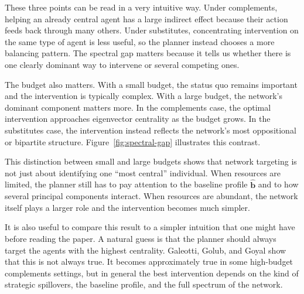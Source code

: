 \documentclass[11pt,letterpaper]{article}
\begin{document}
These three points can be read in a very intuitive way. Under complements, helping an already central agent has a large indirect effect because their action feeds back through many others. Under substitutes, concentrating intervention on the same type of agent is less useful, so the planner instead chooses a more balancing pattern. The spectral gap matters because it tells us whether there is one clearly dominant way to intervene or several competing ones.

The budget also matters. With a small budget, the status quo remains important and the intervention is typically complex. With a large budget, the network's dominant component matters more. In the complements case, the optimal intervention approaches eigenvector centrality as the budget grows. In the substitutes case, the intervention instead reflects the network's most oppositional or bipartite structure. Figure~\ref{fig:spectral-gap} illustrates this contrast.

This distinction between small and large budgets shows that network targeting is not just about identifying one ``most central'' individual. When resources are limited, the planner still has to pay attention to the baseline profile $\hat{\mathbf{b}}$ and to how several principal components interact. When resources are abundant, the network itself plays a larger role and the intervention becomes much simpler.

It is also useful to compare this result to a simpler intuition that one might have before reading the paper. A natural guess is that the planner should always target the agents with the highest centrality. Galeotti, Golub, and Goyal show that this is not always true. It becomes approximately true in some high-budget complements settings, but in general the best intervention depends on the kind of strategic spillovers, the baseline profile, and the full spectrum of the network.
\end{document}
